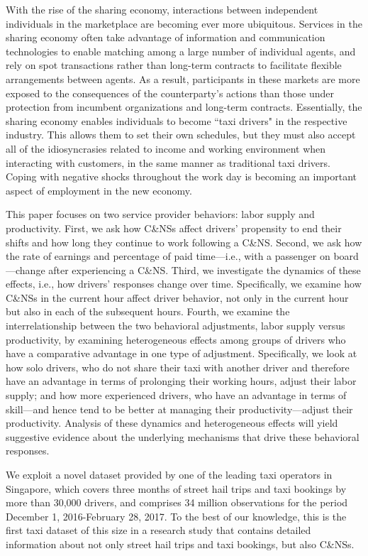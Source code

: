 \documentclass[reviewmode]{AEA}
\begin{document}
With the rise of the sharing economy, interactions between independent individuals in the marketplace are becoming ever more ubiquitous. Services in the sharing economy often take advantage of information and communication technologies to enable matching among a large number of individual agents, and rely on spot transactions rather than long-term contracts to facilitate flexible arrangements between agents. As a result,  participants in these markets are more exposed to the consequences of the counterparty's actions than those under protection from incumbent organizations and long-term contracts. Essentially, the sharing economy enables individuals to become ``taxi drivers" in the respective industry. This allows them to set their own schedules, but they must also accept all of the idiosyncrasies related to income and working environment when interacting with customers, in the same manner as traditional taxi drivers. Coping with negative shocks throughout the work day is becoming an important aspect of employment in the new economy.

This paper focuses on two service provider behaviors: labor supply and productivity. First, we ask how C\&NSs affect drivers' propensity to end their shifts and how long they continue to work following a C\&NS.  Second, we ask how the rate of earnings and percentage of paid time---i.e., with a passenger on board---change after experiencing a C\&NS. Third, we investigate the dynamics of these effects, i.e., how drivers' responses change over time. Specifically, we examine how C\&NSs in the current hour affect driver behavior, not only in the current hour but also in  each of the subsequent hours. Fourth, we examine the interrelationship between the two behavioral adjustments, labor supply versus productivity, by examining heterogeneous effects among groups of drivers who have a comparative advantage in one type of adjustment. Specifically, we look at how solo drivers, who do not share their taxi with another driver and therefore have an advantage in terms of prolonging their working hours, adjust their labor supply; and how more experienced drivers, who have an advantage in terms of skill---and hence tend to be better at managing their productivity---adjust their  productivity. Analysis of these dynamics and heterogeneous effects will yield suggestive evidence about the underlying mechanisms that drive these behavioral responses.

We exploit a novel dataset provided by one of the leading taxi operators in Singapore, which covers three months of street hail trips and taxi bookings by more than 30,000 drivers, and comprises 34 million observations for the period December 1, 2016-February 28, 2017. To the best of our knowledge, this is the first taxi dataset of this size in a research study that contains detailed information about not only street hail trips and taxi bookings, but also C\&NSs.
\end{document}
